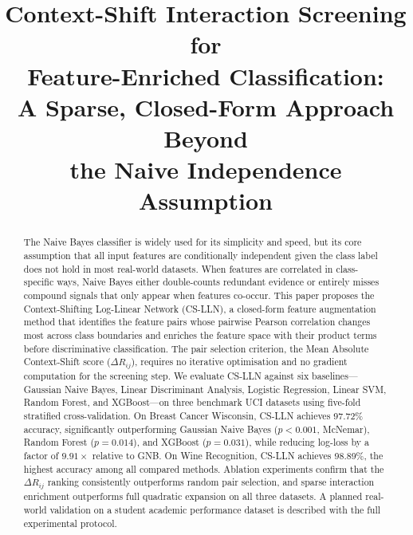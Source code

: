 \documentclass[conference]{IEEEtran}
\begin{document}
\title{Context-Shift Interaction Screening for\\
Feature-Enriched Classification:\\
A Sparse, Closed-Form Approach Beyond\\
the Naive Independence Assumption}

\author{
}

\maketitle

\begin{abstract}
The Naive Bayes classifier is widely used for its simplicity and speed, but
its core assumption that all input features are conditionally independent
given the class label does not hold in most real-world datasets.
When features are correlated in class-specific ways, Naive Bayes either
double-counts redundant evidence or entirely misses compound signals that
only appear when features co-occur.
This paper proposes the Context-Shifting Log-Linear Network (CS-LLN), a
closed-form feature augmentation method that identifies the feature pairs
whose pairwise Pearson correlation changes most across class boundaries and
enriches the feature space with their product terms before discriminative
classification.
The pair selection criterion, the Mean Absolute Context-Shift score
($\Delta R_{ij}$), requires no iterative optimisation and no gradient
computation for the screening step.
We evaluate CS-LLN against six baselines---Gaussian Naive Bayes, Linear
Discriminant Analysis, Logistic Regression, Linear SVM, Random Forest,
and XGBoost---on three benchmark UCI datasets using five-fold stratified
cross-validation.
On Breast Cancer Wisconsin, CS-LLN achieves 97.72\% accuracy, significantly
outperforming Gaussian Naive Bayes ($p < 0.001$, McNemar), Random Forest
($p = 0.014$), and XGBoost ($p = 0.031$), while reducing log-loss by a
factor of $9.91\times$ relative to GNB.
On Wine Recognition, CS-LLN achieves 98.89\%, the highest accuracy among
all compared methods.
Ablation experiments confirm that the $\Delta R_{ij}$ ranking consistently
outperforms random pair selection, and sparse interaction enrichment
outperforms full quadratic expansion on all three datasets.
A planned real-world validation on a student academic performance dataset
is described with the full experimental protocol.
\end{abstract}
\end{document}
